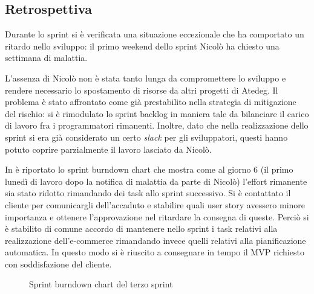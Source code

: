 \subsection{Retrospettiva}
Durante lo sprint si è verificata una situazione eccezionale che ha comportato un ritardo nello sviluppo:
il primo weekend dello sprint Nicolò ha chiesto una settimana di malattia.

L'assenza di Nicolò non è stata tanto lunga da compromettere lo sviluppo e rendere necessario lo spostamento di risorse da altri progetti di Atedeg.
Il problema è stato affrontato come già prestabilito nella strategia di mitigazione del rischio: si è rimodulato lo sprint backlog in maniera tale da bilanciare il carico di lavoro fra i programmatori rimanenti. Inoltre, dato che nella realizzazione dello sprint si era già considerato un certo \emph{slack} per gli sviluppatori, questi hanno potuto coprire parzialmente il lavoro lasciato da Nicolò.

In  è riportato lo sprint burndown chart che mostra come al giorno 6 (il primo lunedì di lavoro dopo la notifica di malattia da parte di Nicolò) l'effort rimanente sia stato ridotto rimandando dei task allo sprint successivo.
Si è contattato il cliente per comunicargli dell'accaduto e stabilire quali user story avessero minore importanza e ottenere l'approvazione nel ritardare la consegna di queste. Perciò si è stabilito di comune accordo di mantenere nello sprint i task relativi alla realizzazione dell'e-commerce rimandando invece quelli relativi alla pianificazione automatica.
In questo modo si è riuscito a consegnare in tempo il MVP richiesto con soddisfazione del cliente.

\begin{figure}[htp]
  \centering
  \caption{Sprint burndown chart del terzo sprint}
  \label{fig:burndown-sprint-3}
\end{figure}


